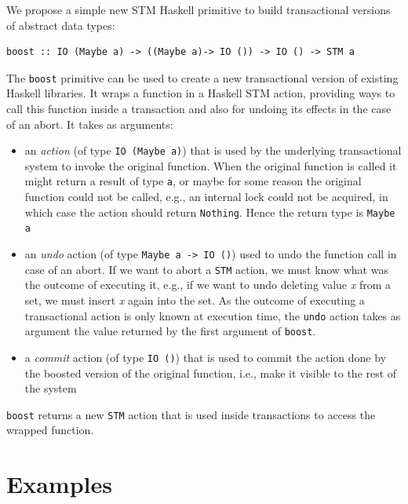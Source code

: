 \documentclass{llncs}
\begin{document}
We propose a simple new STM Haskell primitive to build transactional versions
of abstract data types:

{\small\begin{verbatim}
boost :: IO (Maybe a) -> ((Maybe a)-> IO ()) -> IO () -> STM a
\end{verbatim}}


The {\tt boost} primitive can be used to create a new transactional version of
 existing Haskell libraries. It wraps a function in a Haskell STM action, providing ways to call 
this function inside a transaction and also for undoing its effects in the case of an abort. It takes as arguments:

\begin{itemize}
\item  an {\it action}  (of type {\tt IO (Maybe a)})
that is used by the underlying transactional system to invoke the original function.
When the original function is called it might return a result of type {\tt a},
 or maybe for some reason the original function could not be called, e.g., an internal
lock could not be acquired, in which case the action should return {\tt Nothing}.
Hence the return type is {\tt Maybe a}
\item  an
{\it undo} action (of type  {\tt Maybe a -> IO ()}) used to undo the function call in case of
an abort. If we want to abort a {\tt STM} action, we must know what was the outcome
of executing it, e.g., if we want to undo deleting value {\it x} from
a set, we must insert {\it x} again into the set. 
As the outcome of executing a transactional action is
only known at execution time,
the {\tt undo} action takes as argument the value returned by the first argument of {\tt boost}.

\item a {\it commit} action (of type {\tt IO ()}) that is used to commit the action done 
by the boosted version of the original function, i.e.,
make it visible to the rest of the system
\end{itemize}

{\tt boost} returns a new {\tt STM} action that is  used inside transactions to access
the wrapped function. 


\section{Examples}
\label{sec:examples}
\end{document}
